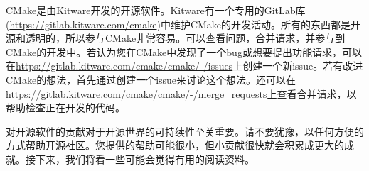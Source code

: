 CMake是由Kitware开发的开源软件。Kitware有一个专用的GitLab库(\url{https://gitlab.kitware.com/cmake})中维护CMake的开发活动。所有的东西都是开源和透明的，所以参与CMake非常容易。可以查看问题，合并请求，并参与到CMake的开发中。若认为您在CMake中发现了一个bug或想要提出功能请求，可以在\url{https://gitlab.kitware.com/cmake/cmake/-/issues}上创建一个新issue。若有改进CMake的想法，首先通过创建一个issue来讨论这个想法。还可以在\url{https://gitlab.kitware.com/cmake/cmake/-/merge_requests}上查看合并请求，以帮助检查正在开发的代码。

对开源软件的贡献对于开源世界的可持续性至关重要。请不要犹豫，以任何方便的方式帮助开源社区。您提供的帮助可能很小，但小贡献很快就会积累成更大的成就。接下来，我们将看一些可能会觉得有用的阅读资料。